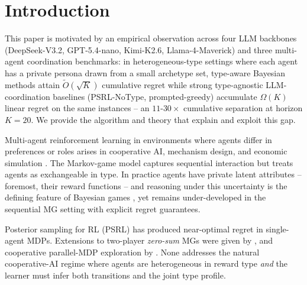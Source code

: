 ﻿\documentclass{article}
\begin{document}
\section{Introduction}
\label{sec:intro}

This paper is motivated by an empirical observation across four LLM backbones (DeepSeek-V3.2, GPT-5.4-nano, Kimi-K2.6, Llama-4-Maverick) and three multi-agent coordination benchmarks: in heterogeneous-type settings where each agent has a private persona drawn from a small archetype set, type-aware Bayesian methods attain $\tilde O(\sqrt K)$ cumulative regret while strong type-agnostic LLM-coordination baselines (PSRL-NoType, prompted-greedy) accumulate $\Omega(K)$ linear regret on the same instances -- an $11$-$30\times$ cumulative separation at horizon $K{=}20$. We provide the algorithm and theory that explain and exploit this gap.

Multi-agent reinforcement learning in environments where agents differ in preferences or roles arises in cooperative AI, mechanism design, and economic simulation \citep{zhang2021multi,leibo2017multi,perolat2017multi}. The Markov-game model \citep{shapley1953stochastic,littman1994markov} captures sequential interaction but treats agents as exchangeable in type. In practice agents have private latent attributes -- foremost, their reward functions -- and reasoning under this uncertainty is the defining feature of Bayesian games \citep{harsanyi1968games}, yet remains under-developed in the sequential MG setting with explicit regret guarantees.

Posterior sampling for RL (PSRL) \citep{strens2000bayesian,osband2013more,agrawal2017optimistic,osband2017posterior} has produced near-optimal regret in single-agent MDPs. Extensions to two-player \emph{zero-sum} MGs were given by \citet{jafarnia2021learning,xiong2022self,yueh2026bayesian}, and cooperative parallel-MDP exploration by \citet{hsu2024randomized}. None addresses the natural cooperative-AI regime where agents are heterogeneous in reward type \emph{and} the learner must infer both transitions and the joint type profile.
\end{document}
